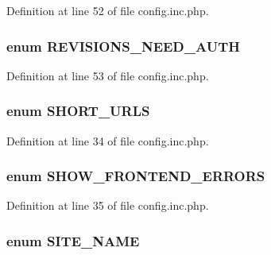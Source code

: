 Definition at line 52 of file config.inc.php.

\hypertarget{config_8inc_8php_a67b9479d334a4e6c33c0bc3505b3eb5e}{
\subsubsection[{REVISIONS\_\-NEED\_\-AUTH}]{\setlength{\rightskip}{0pt plus 5cm}enum {\bf REVISIONS\_\-NEED\_\-AUTH}}}
\label{config_8inc_8php_a67b9479d334a4e6c33c0bc3505b3eb5e}


Definition at line 53 of file config.inc.php.

\hypertarget{config_8inc_8php_a377ac3321785e25215435e8d9802bc34}{
\subsubsection[{SHORT\_\-URLS}]{\setlength{\rightskip}{0pt plus 5cm}enum {\bf SHORT\_\-URLS}}}
\label{config_8inc_8php_a377ac3321785e25215435e8d9802bc34}


Definition at line 34 of file config.inc.php.

\hypertarget{config_8inc_8php_a71022f94adb600e3984795805fe7f8d0}{
\subsubsection[{SHOW\_\-FRONTEND\_\-ERRORS}]{\setlength{\rightskip}{0pt plus 5cm}enum {\bf SHOW\_\-FRONTEND\_\-ERRORS}}}
\label{config_8inc_8php_a71022f94adb600e3984795805fe7f8d0}


Definition at line 35 of file config.inc.php.

\hypertarget{config_8inc_8php_a38f8e1265350d7091b55f4cffe629f3a}{
\subsubsection[{SITE\_\-NAME}]{\setlength{\rightskip}{0pt plus 5cm}enum {\bf SITE\_\-NAME}}}
\label{config_8inc_8php_a38f8e1265350d7091b55f4cffe629f3a}


